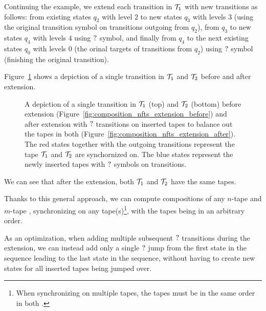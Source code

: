 \begin{example}
  Continuing the example, we extend each \nft transition in $\mathcal{T}_1$ with new transitions as follows: from existing states $q_2$ with level $2$ to new states $q_3$ with levels $3$ (using the original transition symbol on transitions outgoing from $q_2$), from $q_3$ to new states $q_4$ with levels $4$ using $?$ symbol, and finally from $q_4$ to the next existing states $q_0$ with levels $0$ (the orinal targets of transitions from $q_2$) using $?$ symbol (finishing the original \nft transition).

  Figure~\ref{fig:composition_nfts_extension} shows a depiction of a single transition in $\mathcal{T}_1$ and $\mathcal{T}_2$ before and after extension.

  \begin{figure}[ht]
    \centering
    \qquad
    \caption{
      A depiction of a single transition in \nfts $\mathcal{T}_1$ (top) and $\mathcal{T}_2$ (bottom) before extension (Figure~\ref{fig:composition_nfts_extension_before}) and after extension with $?$ transitions on inserted tapes to balance out the tapes in both \nfts (Figure~\ref{fig:composition_nfts_extension_after}).
      The red states together with the outgoing transitions represent the tape $\mathcal{T}_1$ and $\mathcal{T}_2$ are synchornized on.
      The blue states represent the newly inserted tapes with $?$ symbols on transitions.
    }
    \label{fig:composition_nfts_extension}%
  \end{figure}

  We can see that after the extension, both $\mathcal{T}_1$ and $\mathcal{T}_2$ have the same tapes.
\end{example}

Thanks to this general approach, we can compute compositions of any $n$-tape and $m$-tape \nfts, synchronizing on any tape(s)\footnote{When synchronizing on multiple tapes, the tapes must be in the same order in both \nfts.}, with the tapes being in an arbitrary order.

As an optimization, when adding multiple subsequent $?$ transitions during the extension, we can instead add only a single $?$ jump from the first state in the sequence leading to the last state in the sequence, without having to create new states for all inserted tapes being jumped over.

